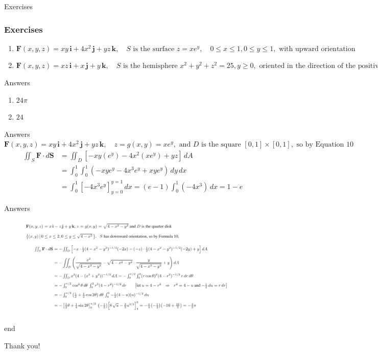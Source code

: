 \documentclass[aspectratio=169]{beamer}
\begin{document}
\begin{frame}{Exercises}
    \frametitle{Exercises}
    \begin{enumerate}
        \item $\mathbf{F}(x, y, z) = xy\,\mathbf{i} + 4x^2\,\mathbf{j} + yz\,\mathbf{k}, \quad S \text{ is the surface } z = xe^y, \quad 0 \le x \le 1, 0 \le y \le 1, \text{ with upward orientation}$
        \item $\mathbf{F}(x, y, z) = xz\,\mathbf{i} + x\,\mathbf{j} + y\,\mathbf{k}, \quad S \text{ is the hemisphere } x^2 + y^2 + z^2 = 25, y \ge 0, \text{ oriented in the direction of the positive y-axis}$
    \end{enumerate}
\end{frame}

\begin{frame}{Answers}
    \begin{enumerate}
        \item $24 \pi$
        \item $24$
    \end{enumerate}
\end{frame}

\begin{frame}{Answers}
    $\mathbf{F}(x, y, z) = xy\,\mathbf{i} + 4x^2\,\mathbf{j} + yz\,\mathbf{k}, \quad z = g(x, y) = xe^y, \text{ and } D \text{ is the square } [0, 1] \times [0, 1], \text{ so by Equation 10}$
                \begin{align*}
                    \iint_S \mathbf{F} \cdot d\mathbf{S} &= \iint_D [-xy(e^y) - 4x^2(xe^y) + yz] \, dA \\
                    &= \int_0^1 \int_0^1 (-xye^y - 4x^3 e^y + xye^y) \, dy \, dx \\
                    &= \int_0^1 \left[-4x^3 e^y\right]_{y=0}^{y=1} \, dx = (e-1) \int_0^1 (-4x^3) \, dx = 1-e
                \end{align*}
\end{frame}

\begin{frame}{Answers}
   \begin{figure}
            \centering
            \includegraphics[width=1\linewidth]{ans.png}
            \label{fig:enter-label}
        \end{figure}
\end{frame}

\begin{frame}{\textcolor{green!30!black}{end}}
    \begin{center}
        \LARGE Thank you!
    \end{center}
\end{frame}
\end{document}
